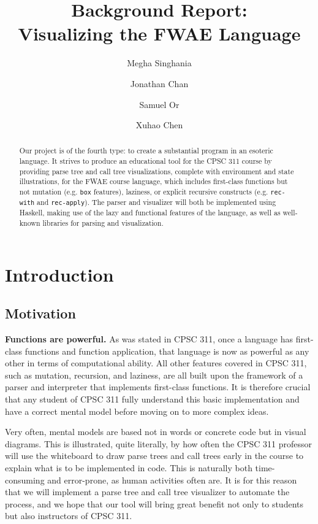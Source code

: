 \documentclass[format=acmlarge, review=false, nonacm=false, screen=true]{acmart}
\begin{document}
\title{Background Report:\\Visualizing the FWAE Language}

\author{Megha Singhania}
\author{Jonathan Chan}
\author{Samuel Or}
\author{Xuhao Chen}

\begin{abstract}
\vspace{1em}

Our project is of the fourth type: to create a substantial program in an esoteric language. It strives to produce an educational tool for the CPSC 311 course by providing parse tree and call tree visualizations, complete with environment and state illustrations, for the FWAE course language, which includes first-class functions but not mutation (e.g. \texttt{box} features), laziness, or explicit recursive constructs (e.g. \texttt{rec-with} and \texttt{rec-apply}). The parser and visualizer will both be implemented using Haskell, making use of the lazy and functional features of the language, as well as well-known libraries for parsing and visualization.
\end{abstract}

\maketitle

\setcounter{section}{-1}
\section{Introduction}
\subsection{Motivation}
\textbf{Functions are powerful.} As was stated in CPSC 311, once a language has first-class functions and function application, that language is now as powerful as any other in terms of computational ability. All other features covered in CPSC 311, such as mutation, recursion, and laziness, are all built upon the framework of a parser and interpreter that implements first-class functions. It is therefore crucial that any student of CPSC 311 fully understand this basic implementation and have a correct mental model before moving on to more complex ideas.

Very often, mental models are based not in words or concrete code but in visual diagrams. This is illustrated, quite literally, by how often the CPSC 311 professor will use the whiteboard to draw parse trees and call trees early in the course to explain what is to be implemented in code. This is naturally both time-consuming and error-prone, as human activities often are. It is for this reason that we will implement a parse tree and call tree visualizer to automate the process, and we hope that our tool will bring great benefit not only to students but also instructors of CPSC 311.
\end{document}
